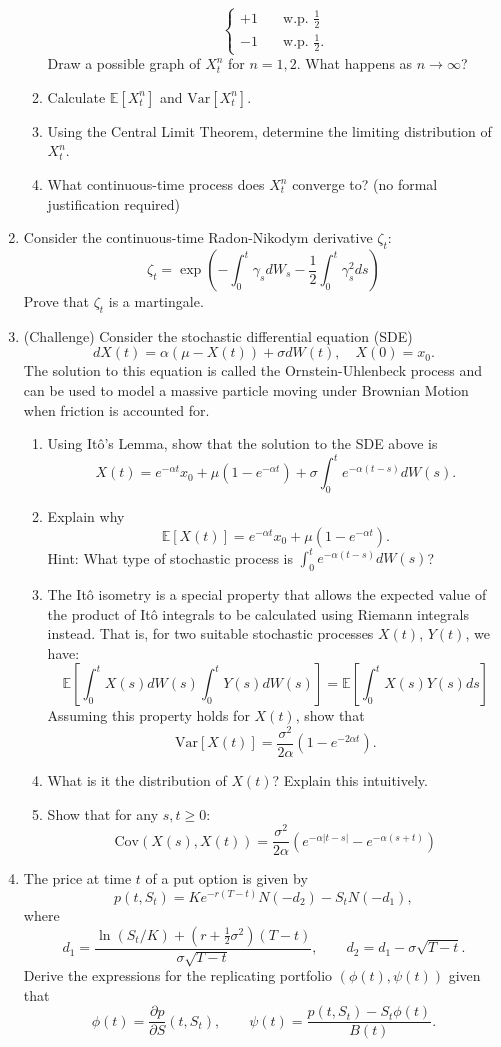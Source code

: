 \documentclass[11pt]{article}
\newcommand{\E}{\mathbb{E}}
\begin{document}
\begin{enumerate}
\begin{enumerate}
\[\begin{cases}
				+1 &  \quad \text{w.p. } \frac{1}{2} \\
				-1 & \quad \text{w.p. } \frac{1}{2}.
			\end{cases}
			\]
			Draw a possible graph of $X^{n}_{t}$ for $n=1,2$. What happens as $n\to\infty$?
			\item Calculate $\E[X^{n}_{t}]$ and $\text{Var}[X^{n}_{t}]$.
			\item Using the Central Limit Theorem, determine the limiting distribution of $X^{n}_{t}$.
			\item What continuous-time process does $X^{n}_{t}$ converge to? (no formal justification required)
		\end{enumerate}
		\item Consider the continuous-time Radon-Nikodym derivative $\zeta_t$:
		\[	\zeta_t = \exp\left(-\int_{0}^{t}\gamma_{s}dW_s -\frac{1}{2} \int_{0}^{t}\gamma_{s}^{2}ds\right)
		\]
		Prove that $\zeta_t$ is a martingale.
		\item (Challenge) Consider the stochastic differential equation (SDE)
		\[	dX(t) = \alpha(\mu - X(t))+ \sigma dW(t),\quad X(0) = x_{0}.
		\]
		The solution to this equation is called the Ornstein-Uhlenbeck process and can be used to model a massive particle moving under Brownian Motion when friction is accounted for.
		\begin{enumerate}
			\item Using It\^{o}'s Lemma, show that the solution to the SDE above 
			is 
			\[	X(t) = e^{-\alpha t}x_{0} + \mu(1 - e^{-\alpha t}) + \sigma\int_{0}^{t}e^{-\alpha(t - s)}dW(s).
			\]
			\item Explain why 
			\[	\E[X(t)] = e^{-\alpha t}x_{0} + \mu(1 - e^{-\alpha t}).
			\]
			Hint: What type of stochastic process is $\int_{0}^{t}e^{-\alpha(t - s)}dW(s)$?
			\item The It\^{o} isometry is a special property that allows the expected value of the product of It\^{o} integrals to be calculated using Riemann integrals instead. That is, for two suitable stochastic processes $X(t)$, $Y(t)$, we have:
			\[	\E\left[\int_{0}^{t}X(s)dW(s)\int_{0}^{t}Y(s)dW(s)\right]
			= \E\left[\int_{0}^{t}X(s)Y(s)ds\right]
			\]
			Assuming this property holds for $X(t)$, show that
			\[	\text{Var}[X(t)] = \frac{\sigma^{2}}{2\alpha}(1 - e^{-2\alpha t}).
			\]
			\item What is it the distribution of $X(t)$? Explain this intuitively.
			\item Show that for any $s, t\geq 0$:
			\[	\text{Cov}(X(s), X(t)) = \frac{\sigma^{2}}{2\alpha}(e^{-\alpha|t - s|} - e^{-\alpha(s + t)})
			\]
		\end{enumerate}
		\item The price at time $t$ of a put option is given by 
		\[		p(t, S_t) = Ke^{-r(T - t)}N(-d_{2}) - S_t N(-d_1),
		\]
		where
		\[		d_{1} = \frac{\ln(S_t/ K) + (r + \frac{1}{2}\sigma^2)(T -t)}{\sigma \sqrt{T - t}},\qquad d_{2} = d_{1} - \sigma \sqrt{T - t}.
		\]
		Derive the expressions for the replicating portfolio $(\phi(t), \psi(t))$ given that
		\[		\phi(t) = \frac{\partial p}{\partial S}(t, S_t),\qquad \psi(t)=\frac{p(t, S_t) - S_t \phi(t)}{B(t)}.
		\]
	\end{enumerate}
\end{document}

